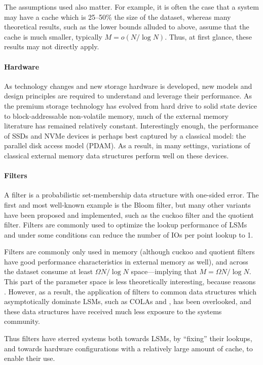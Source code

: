 The assumptions used also matter. For example, it is often the case that a
system may have a cache which is 25--50\% the size of the dataset, whereas many
theoretical results, such as the lower bounds alluded to above, assume that the
cache is much smaller, typically $M = o(N/\log{N})$. Thus, at first glance,
these results may not directly apply.

\paragraph{Hardware}
As technology changes and new storage hardware is developed, new models and
design principles are required to understand and leverage their performance. As
the premium storage technology has evolved from hard drive to solid state
device to block-addressable non-volatile memory, much of the external memory
literature has remained relatively constant. Interestingly enough, the
performance of SSDs and NVMe devices is perhaps best captured by a classical
model: the parallel disk access model (PDAM). As a result, in many settings,
variations of classical external memory data structures perform well on these
devices.

\paragraph{Filters}
A filter is a probabilistic set-membership data structure with one-sided error.
The first and most well-known example is the Bloom filter, but many other
variants have been proposed and implemented, such as the cuckoo filter and the
quotient filter. Filters are commonly used to optimize the lookup performance
of LSMs and under some conditions can reduce the number of IOs per point lookup
to 1.

Filters are commonly only used in memory (although cuckoo and quotient filters
have good performance characteristics in external memory as well), and across
the dataset consume at least $\Omega{N/\log{N}}$ space---implying that $M =
\Omega{N/\log{N}}$. This part of the parameter space is less theoretically
interesting, because reasons . However, as a result, the application
of filters to common data structures which asymptotically dominate LSMs, such
as COLAs and \bets, has been overlooked, and these data structures have
received much less exposure to the systems community.

Thus filters have sterred systems both towards LSMs, by ``fixing'' their
lookups, and towards hardware configurations with a relatively large amount of
cache, to enable their use.

